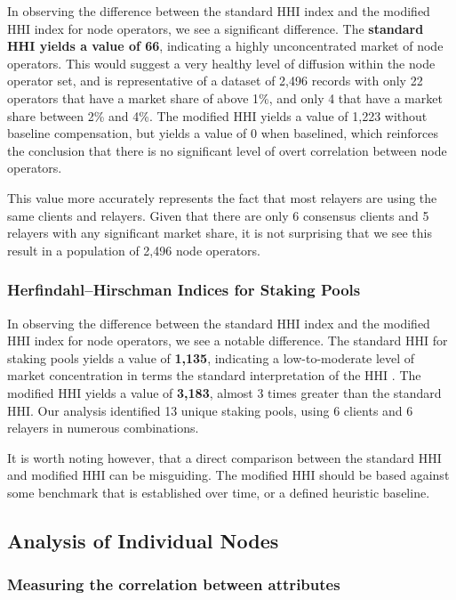 \documentclass[conference]{IEEEtran}
\begin{document}
In observing the difference between the standard HHI index and the modified HHI index for node operators, we see a significant difference.  The \textbf{standard HHI yields a value of 66}, indicating a highly unconcentrated market of node operators.  This would suggest a very healthy level of diffusion within the node operator set, and is representative of a dataset of 2,496 records with only 22 operators that have a market share of above 1\%, and only 4 that have a market share between 2\% and 4\%.  The modified HHI yields a value of 1,223 without baseline compensation, but yields a value of 0 when baselined, which reinforces the conclusion that there is no significant level of overt correlation between node operators.

This value more accurately represents the fact that most relayers are using the same clients and relayers.  Given that there are only 6 consensus clients and 5 relayers with any significant market share, it is not surprising that we see this result in a population of 2,496 node operators.

\subsubsection{Herfindahl–Hirschman Indices for Staking Pools}

In observing the difference between the standard HHI index and the modified HHI index for node operators, we see a notable difference.  The standard HHI for staking pools yields a value of \textbf{1,135}, indicating a low-to-moderate level of market concentration in terms the standard interpretation of the HHI \cite{usdoj2015}.  The modified HHI yields a value of \textbf{3,183}, almost 3 times greater than the standard HHI.  Our analysis identified 13 unique staking pools, using 6 clients and 6 relayers in numerous combinations.

It is worth noting however, that a direct comparison between the standard HHI and modified HHI can be misguiding.  The modified HHI should be based against some benchmark that is established over time, or a defined heuristic baseline.

\subsection{Analysis of Individual Nodes}

\subsubsection{Measuring the correlation between attributes}
\end{document}
